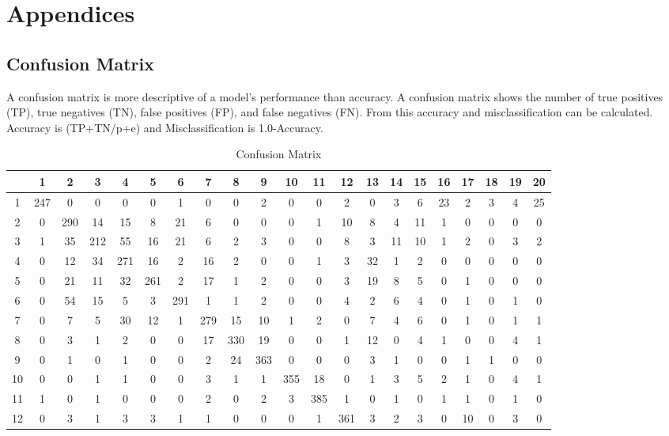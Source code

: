 \documentclass{IEEEtran}
\begin{document}
\printbibliography

\newpage
\onecolumn
\appendix
\section{Appendices}
\subsection{Confusion Matrix}
A confusion matrix is more descriptive of a model's performance than accuracy. A confusion matrix shows the number of true positives (TP), true negatives (TN), false positives (FP), and false negatives (FN). From this accuracy and misclassification can be calculated. Accuracy is (TP+TN/p+e) and Misclassification is 1.0-Accuracy.

\begin{table}[ht]
  \caption{Confusion Matrix}
  \centering
  \begin{tabular}{c c c c c c c c c c c c c c c c c c c c c}
   \hline\hline
       &  1 &   2 &   3 &   4 &   5 &   6 &   7 &   8 &   9 &  10 &  11 &  12 &  13 &  14 &  15 &  16 &  17 &  18 &  19 &  20 \\
   \hline
     1 & 247 &   0 &   0 &   0  & 0 &  1 & 0 & 0 & 2 & 0 & 0 &  2 & 0 & 3 &  6 & 23 & 2 & 3 & 4 & 25 \\
     2 &   0 & 290 &  14 &  15  & 8 & 21 & 6 & 0 & 0 & 0 & 1 & 10 & 8 & 4 & 11 &  1 & 0 & 0 & 0 &  0 \\
     3 &   1 &  35 & 212 &  55  &16&21&6&2&3&0&0&8&3&11&10&1&2&0&3&2 \\
     4 &   0 &  12 &  34 & 271 &16&2&16&2&0&0&1&3&32&1&2&0&0&0&0&0 \\
     5 &   0 &  21 &  11 &  32 &261&2&17&1&2&0&0&3&19&8&5&0&1&0&0&0 \\
     6 &   0 &  54 &  15 &   5 &3&291&1&1&2&0&0&4&2&6&4&0&1&0&1&0 \\
     7 &   0 &   7 &   5 &  30 &12&1&279&15&10&1&2&0&7&4&6&0&1&0&1&1 \\
     8 &   0 &   3 &   1 &   2 &0&0&17&330&19&0&0&1&12&0&4&1&0&0&4&1 \\
     9 &   0 &   1 &   0 &   1 &0&0&2&24&363&0&0&0&3&1&0&0&1&1&0&0 \\
    10 &   0 &   0 &   1 &   1 &0&0&3&1&1&355&18&0&1&3&5&2&1&0&4&1 \\
    11 &   1 &   0 &   1 &   0 &0&0&2&0&2&3&385&1&0&1&0&1&1&0&1&0 \\
    12 &   0 &   3 &   1 &   3 &3&1&1&0&0&0&1&361&3&2&3&0&10&0&3&0 \\

\end{tabular}
\end{table}
\end{document}
